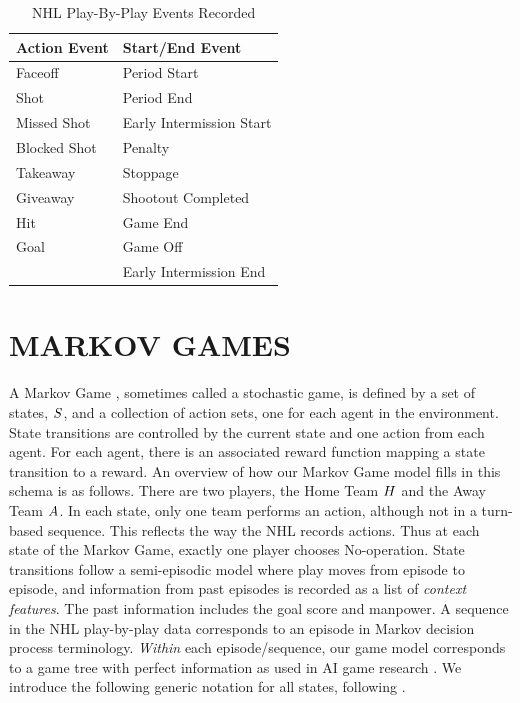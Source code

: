 \documentclass[]{article}
\begin{document}
\begin{table}[htb]
\caption{NHL Play-By-Play Events Recorded}
\label{table:events-recorded}
\begin{center}
\begin{tabular}{|l|l|}
\hline
 \bf{Action Event} & \bf{Start/End Event}\\ \hline
Faceoff & Period Start \\\hline
Shot & Period End \\\hline
Missed Shot & Early Intermission Start\\ \hline
Blocked Shot & Penalty\\ \hline
Takeaway & Stoppage\\  \hline
Giveaway & Shootout Completed\\ \hline
Hit & Game End\\ \hline
Goal & Game Off\\ \hline
& Early Intermission End \\
\hline
\end{tabular}
\end{center}
\end{table}



\section{MARKOV GAMES}
A Markov Game \citep{Littman1994}, sometimes called a stochastic game, is defined by a set of states, $S$, and a collection of action sets, one for each agent in the environment. State transitions are controlled by the current state and one action from each agent. For each agent, there is an associated reward function mapping a state transition to a reward. An overview of how our Markov Game model fills in this schema is as follows. There are two players, the Home Team $H$ and the Away Team $A$.
In each state, only one team performs an action, although not in a turn-based sequence.
This reflects the way the NHL records actions.
Thus at each state of the Markov Game, exactly one player chooses No-operation.
State transitions follow a semi-episodic model \citep{bib:sutton} where play moves from episode to episode, and information from past episodes is recorded as a list of {\em context features}. The past information includes the goal score and manpower. A sequence in the NHL play-by-play data corresponds to an episode in Markov decision process terminology. {\em Within} each episode/sequence, our game model corresponds to a game tree with perfect information as used in AI game research \citep{Russell2010}. We introduce the following generic notation for all states, following \citep{Russell2010,Littman1994}.
\end{document}
